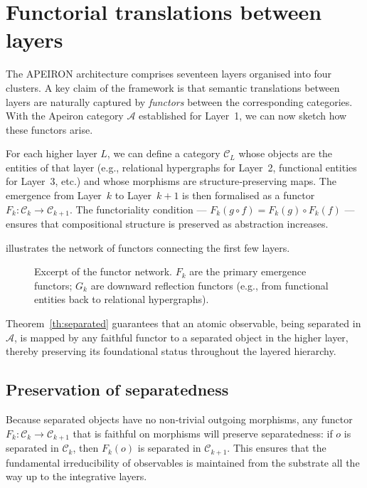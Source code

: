 \section{Functorial translations between layers}\label{sec:functorial}

The APEIRON architecture comprises seventeen layers organised into four clusters.
A key claim of the framework is that semantic translations between layers are naturally captured by \emph{functors} between the corresponding categories.
With the Apeiron category $\mathcal{A}$ established for Layer~1, we can now sketch how these functors arise.

For each higher layer $L$, we can define a category $\mathcal{C}_L$ whose objects are the entities of that layer (e.g., relational hypergraphs for Layer~2, functional entities for Layer~3, etc.) and whose morphisms are structure‑preserving maps.
The emergence from Layer~$k$ to Layer~$k+1$ is then formalised as a functor $F_k:\mathcal{C}_k\to\mathcal{C}_{k+1}$.
The functoriality condition --- $F_k(g\circ f)=F_k(g)\circ F_k(f)$ --- ensures that compositional structure is preserved as abstraction increases.

 illustrates the network of functors connecting the first few layers.
\begin{figure}[htbp]
\centering

\caption{Excerpt of the functor network. $F_k$ are the primary emergence functors; $G_k$ are downward reflection functors (e.g., from functional entities back to relational hypergraphs).}\label{fig:layer_functors}
\end{figure}

Theorem~\ref{th:separated} guarantees that an atomic observable, being separated in $\mathcal{A}$, is mapped by any faithful functor to a separated object in the higher layer, thereby preserving its foundational status throughout the layered hierarchy.

\subsection{Preservation of separatedness}
Because separated objects have no non‑trivial outgoing morphisms, any functor $F_k : \mathcal{C}_k \to \mathcal{C}_{k+1}$ that is faithful on morphisms will preserve separatedness: if $o$ is separated in $\mathcal{C}_k$, then $F_k(o)$ is separated in $\mathcal{C}_{k+1}$.
This ensures that the fundamental irreducibility of observables is maintained from the substrate all the way up to the integrative layers.

